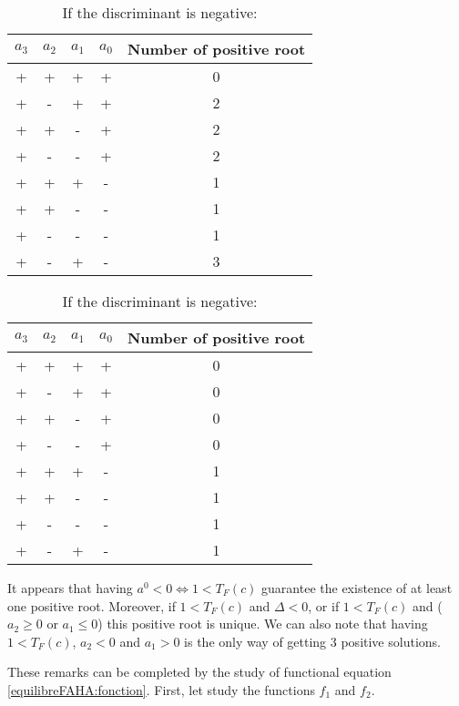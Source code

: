 \documentclass{article}
\begin{document}
\begin{appendices}
\begin{table}[!ht]
\begin{minipage}[c]{0.5\linewidth}
\centering
\caption{If the discriminant is non-negative:}
\begin{tabular}{c|c|c|c|c}
$a_3$ & $a_2$ & $a_1$ & $a_0$ & Number of positive root \\
\hline
+ & + & + & + & 0 \\
+ & - & + & + & 2 \\
+ & + & - & + & 2 \\
+ & - & - & + & 2 \\
+ & + & + & - & 1 \\
+ & + & - & - & 1 \\
+ & - & - & - & 1 \\
+ & - & + & - & 3
\end{tabular}
\end{minipage}
\hfill
\begin{minipage}{0.5\linewidth}
\centering
\caption{If the discriminant is negative:}
\centering
\begin{tabular}{c|c|c|c|c}
$a_3$ & $a_2$ & $a_1$ & $a_0$ & Number of positive root \\
\hline
+ & + & + & + & 0 \\
+ & - & + & + & 0 \\
+ & + & - & + & 0 \\
+ & - & - & + & 0 \\
+ & + & + & - & 1 \\
+ & + & - & - & 1 \\
+ & - & - & - & 1 \\
+ & - & + & - & 1
\end{tabular}
\end{minipage}
\end{table}

It appears that having $a^0 < 0 \Leftrightarrow 1 < T_F(c)$ guarantee the existence of at least one positive root. Moreover, if $1 < T_F(c)$ and $\Delta < 0$, or if $1 < T_F(c)$ and ($a_2 \geq 0$ or $a_1 \leq 0$) this positive root is unique.
We can also note that having $1 < T_F(c)$, $a_2 < 0$ and $a_1 > 0$ is the only way of getting 3 positive solutions.

These remarks can be completed by the study of functional equation \eqref{equilibreFAHA:fonction}. First, let study the functions $f_1$ and $f_2$.


\end{appendices}
\end{document}
